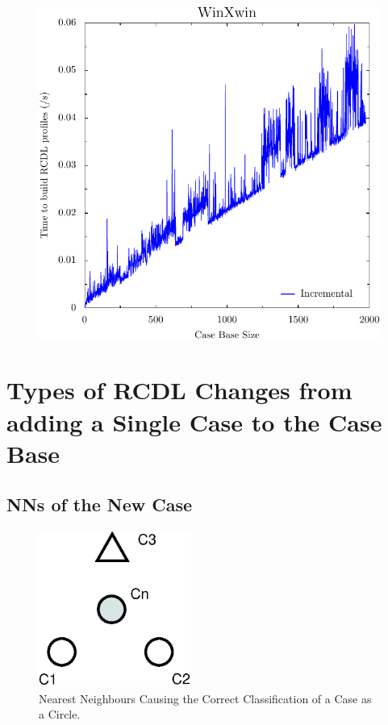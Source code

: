 \documentclass[a4paper,11pt]{report}
\begin{document}
\begin{figure}[h!] 
\centering
\includegraphics[width=400pt]{./ExperimentResults/WinXwin_timings_incr_only}
\end{figure}


\section{Types of RCDL Changes from adding a Single Case to the Case Base}
\subsection{NNs of the New Case}
\begin{figure}[h!] 
\centering
	\includegraphics[width=5cm]{./Drawn/NNsCorrectlyClassify}
\caption{Nearest Neighbours Causing the Correct Classification of a Case as a Circle.}
\label{fig:NNsCorrect}
\end{figure}
\end{document}
